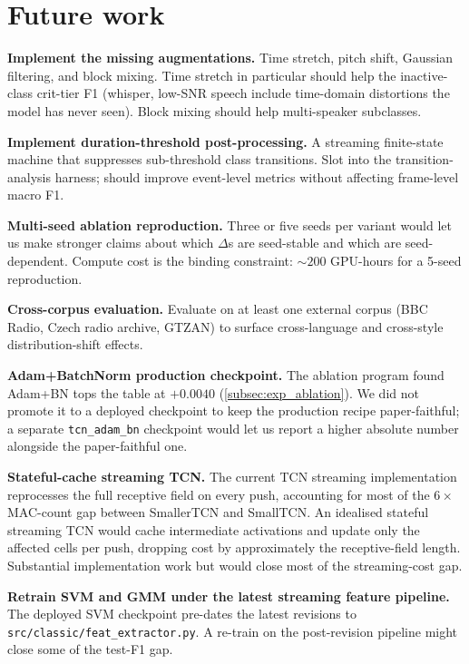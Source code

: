 \section{Future work}
\label{sec:conclusion_future}

\textbf{Implement the missing augmentations.}
Time stretch, pitch shift, Gaussian filtering, and block mixing.
Time stretch in particular should help the inactive-class crit-tier F1 (whisper, low-SNR speech include time-domain distortions the model has never seen).
Block mixing should help multi-speaker subclasses.

\textbf{Implement duration-threshold post-processing.}
A streaming finite-state machine that suppresses sub-threshold class transitions.
Slot into the transition-analysis harness; should improve event-level metrics without affecting frame-level macro F1.

\textbf{Multi-seed ablation reproduction.}
Three or five seeds per variant would let us make stronger claims about which $\Delta$s are seed-stable and which are seed-dependent.
Compute cost is the binding constraint: $\sim 200$ GPU-hours for a 5-seed reproduction.

\textbf{Cross-corpus evaluation.}
Evaluate on at least one external corpus (BBC Radio, Czech radio archive, GTZAN) to surface cross-language and cross-style distribution-shift effects.

\textbf{Adam+BatchNorm production checkpoint.}
The ablation program found Adam+BN tops the table at $+0.0040$ (\cref{subsec:exp_ablation}).
We did not promote it to a deployed checkpoint to keep the production recipe paper-faithful; a separate \texttt{tcn\_adam\_bn} checkpoint would let us report a higher absolute number alongside the paper-faithful one.

\textbf{Stateful-cache streaming TCN.}
The current TCN streaming implementation reprocesses the full receptive field on every push, accounting for most of the $6\times$ MAC-count gap between SmallerTCN and SmallTCN.
An idealised stateful streaming TCN would cache intermediate activations and update only the affected cells per push, dropping cost by approximately the receptive-field length.
Substantial implementation work but would close most of the streaming-cost gap.

\textbf{Retrain SVM and GMM under the latest streaming feature pipeline.}
The deployed SVM checkpoint pre-dates the latest revisions to \texttt{src/classic/feat\_extractor.py}.
A re-train on the post-revision pipeline might close some of the test-F1 gap.
